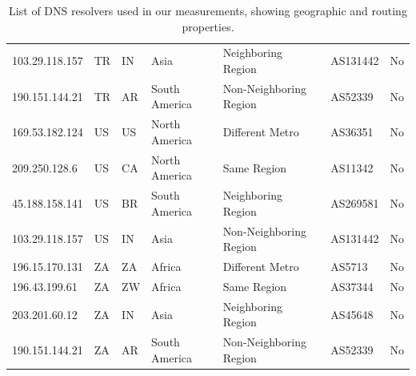 \begin{table}[h]
\begin{tabular}{|l|l|l|l|l|l|c|}
		103.29.118.157 & TR & IN & Asia & Neighboring Region & AS131442 & No \\
		190.151.144.21 & TR & AR & South America & Non-Neighboring Region & AS52339 & No \\
		\hline
		169.53.182.124 & US & US & North America & Different Metro & AS36351 & No \\
		209.250.128.6 & US & CA & North America & Same Region & AS11342 & No \\
		45.188.158.141 & US & BR & South America & Neighboring Region & AS269581 & No \\
		103.29.118.157 & US & IN & Asia & Non-Neighboring Region & AS131442 & No \\
		\hline
		196.15.170.131 & ZA & ZA & Africa & Different Metro & AS5713 & No \\
		196.43.199.61 & ZA & ZW & Africa & Same Region & AS37344 & No \\
		203.201.60.12 & ZA & IN & Asia & Neighboring Region & AS45648 & No \\
		190.151.144.21 & ZA & AR & South America & Non-Neighboring Region & AS52339 & No \\
		\hline
	\end{tabular}
	\caption{List of DNS resolvers used in our measurements, showing geographic and routing properties.}
	\label{tab:resolver_summary}
\end{table}